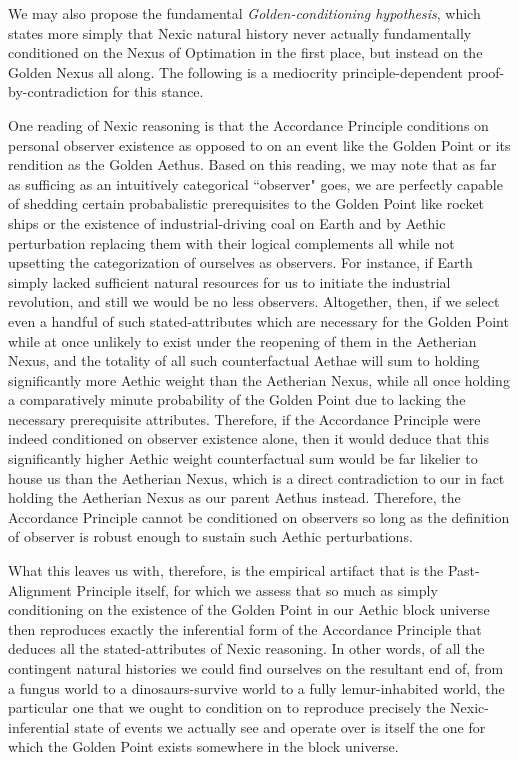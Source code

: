 \documentclass[11pt]{article}
\numberwithin{equation}{section}
\theoremstyle{plain}
\theoremstyle{definition}
\theoremstyle{remark}
\begin{document}
We may also propose the fundamental \textit{Golden-conditioning hypothesis}, which states more simply that Nexic natural history never actually fundamentally conditioned on the Nexus of Optimation in the first place, but instead on the Golden Nexus all along. The following is a mediocrity principle-dependent proof-by-contradiction for this stance. 
\begin{prince}
    One reading of Nexic reasoning is that the Accordance Principle conditions on personal observer existence as opposed to on an event like the Golden Point or its rendition as the Golden Aethus. Based on this reading, we may note that as far as sufficing as an intuitively categorical ``observer" goes, we are perfectly capable of shedding certain probabalistic prerequisites to the Golden Point like rocket ships or the existence of industrial-driving coal on Earth and by Aethic perturbation replacing them with their logical complements all while not upsetting the categorization of ourselves as observers. For instance, if Earth simply lacked sufficient natural resources for us to initiate the industrial revolution, and still we would be no less observers. Altogether, then, if we select even a handful of such stated-attributes which are necessary for the Golden Point while at once unlikely to exist under the reopening of them in the Aetherian Nexus, and the totality of all such counterfactual Aethae will sum to holding significantly more Aethic weight than the Aetherian Nexus, while all once holding a comparatively minute probability of the Golden Point due to lacking the necessary prerequisite attributes. Therefore, if the Accordance Principle were indeed conditioned on observer existence alone, then it would deduce that this significantly higher Aethic weight counterfactual sum would be far likelier to house us than the Aetherian Nexus, which is a direct contradiction to our in fact holding the Aetherian Nexus as our parent Aethus instead. Therefore, the Accordance Principle cannot be conditioned on observers so long as the definition of observer is robust enough to sustain such Aethic perturbations. 

    What this leaves us with, therefore, is the empirical artifact that is the Past-Alignment Principle itself, for which we assess that so much as simply conditioning on the existence of the Golden Point in our Aethic block universe then reproduces exactly the inferential form of the Accordance Principle that deduces all the stated-attributes of Nexic reasoning. In other words, of all the contingent natural histories we could find ourselves on the resultant end of, from a fungus world to a dinosaurs-survive world to a fully lemur-inhabited world, the particular one that we ought to condition on to reproduce precisely the Nexic-inferential state of events we actually see and operate over is itself the one for which the Golden Point exists somewhere in the block universe. 
\end{prince}
\end{document}
